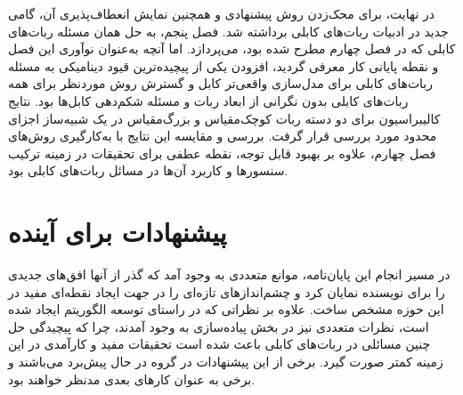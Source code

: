 در نهایت، برای محک‌زدن روش پیشنهادی و همچنین نمایش انعطاف‌پذیری آن، گامی جدید در ادبیات ربات‌های کابلی برداشته شد. فصل پنجم، به حل همان مسئله ربات‌های کابلی که در فصل چهارم مطرح شده بود، می‌پردازد. اما آنچه به‌عنوان نوآوری این فصل و نقطه پایانی کار معرفی گردید، افزودن یکی از پیچیده‌ترین قیود دینامیکی به مسئله ربات‌های کابلی برای مدل‌سازی واقعی‌تر کابل و گسترش روش موردنظر برای همه ربات‌های کابلی بدون نگرانی از ابعاد ربات و مسئله شکم‌دهی کابل‌ها بود. نتایج کالیبراسیون برای دو دسته ربات کوچک‌مقیاس و بزرگ‌مقیاس در یک شبیه‌ساز اجزای محدود مورد بررسی قرار گرفت. بررسی  و مقایسه این نتایج با به‌کارگیری روش‌های فصل چهارم، علاوه بر بهبود قابل توجه، نقطه عطفی برای تحقیقات در زمینه ترکیب سنسورها و کاربرد آن‌ها در مسائل ربات‌های کابلی بود.

\section{پیشنهادات برای آینده}

در مسیر انجام این پایان‌نامه، موانع متعددی به وجود آمد که گذر از آنها افق‌های جدیدی را برای نویسنده نمایان کرد و چشم‌اندازهای تازه‌ای را در جهت ایجاد نقطه‌ای مفید در این حوزه مشخص ساخت. علاوه بر نظراتی که در راستای توسعه الگوریتم ایجاد شده است، نظرات متعددی نیز در بخش پیاده‌سازی به وجود آمدند، چرا که پیچیدگی حل چنین مسائلی در ربات‌های کابلی باعث شده است تحقیقات مفید و کارآمدی در این زمینه کمتر صورت گیرد. برخی از این پیشنهادات در گروه در حال پیش‌برد می‌باشند و برخی به عنوان کار‌های بعدی مدنظر خواهند بود. 

